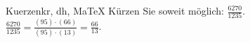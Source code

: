 \begin{MAufgabe}{Kuerzen}{kr, dh, MaTeX}
K\"urzen Sie soweit m\"oglich: $\frac{6270}{1235}$.\\ 
\ifLsg\MLoesung
\quad $\frac{6270}{1235}=\frac{(95)\cdot(66)}{(95)\cdot(13)}=\frac{66}{13}$.\else\relax\fi
 \end{MAufgabe}